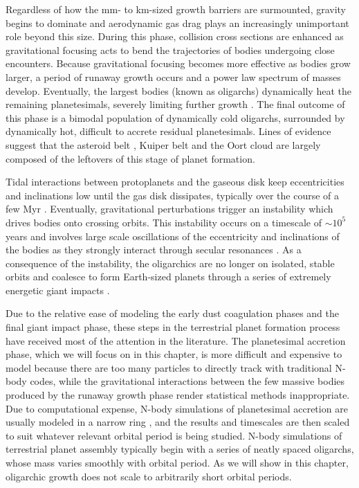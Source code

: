 Regardless of how the mm- to km-sized growth barriers are surmounted, gravity begins to dominate and aerodynamic gas drag 
plays an increasingly unimportant role beyond this size. During this phase, collision cross sections are enhanced as gravitational 
focusing \cite{safronov69} acts to bend the trajectories of bodies undergoing close encounters. Because gravitational focusing 
becomes more effective as bodies grow larger, a period of runaway growth occurs \cite{wetherill89, kokubo96, barnes09} and a 
power law spectrum of masses develop. Eventually, the largest bodies (known as oligarchs) dynamically heat the remaining 
planetesimals, severely limiting further growth \cite{kokubo98}. The final outcome of this phase is a bimodal population of 
dynamically cold oligarchs, surrounded by dynamically hot, difficult to accrete residual planetesimals. Lines of evidence suggest 
that the asteroid belt \cite{bottke05, morbidelli09}, Kuiper belt \cite{duncan89, levison08, sheppard10} and the Oort cloud  \cite{levison11} are largely composed of the leftovers of this stage of planet formation.

Tidal interactions between protoplanets and the gaseous disk keep eccentricities and inclinations low until the gas disk dissipates, typically over the course of a few Myr \cite{mamajek09}. Eventually, gravitational perturbations trigger an instability which drives bodies onto crossing orbits. This instability occurs on a timescale of $\sim 10^{5}$ years and involves large scale oscillations of the eccentricity and inclinations of the bodies as they strongly interact through secular resonances \cite{chambers98}.
As a consequence of the instability, the oligarchics are no longer
on isolated, stable orbits and coalesce to form Earth-sized planets
through a series of extremely energetic giant 
impacts \cite{kokubo02, raymond05, raymond06}. 

Due to the relative ease of modeling the early dust coagulation phases
and the final giant impact phase, these steps in the terrestrial
planet formation process have received most of the attention in the
literature. The planetesimal accretion phase, which we will focus on
in this chapter, is more difficult and expensive to model because there are too
many particles to directly track with traditional N-body codes, while
the gravitational interactions between the few massive bodies produced by the runaway growth phase \cite{ida93, kokubo95, kokubo98} render statistical methods inappropriate. Due to computational expense, N-body simulations of
planetesimal accretion are usually modeled in a narrow
ring \cite{kokubo96, kokubo98}, and the results and timescales are then scaled to suit whatever relevant orbital period is being 
studied. N-body simulations of terrestrial planet assembly typically begin with a series of neatly spaced oligarchs, whose mass 
varies smoothly with orbital period. As we will show in this chapter, oligarchic growth does not scale to arbitrarily short
orbital periods.

